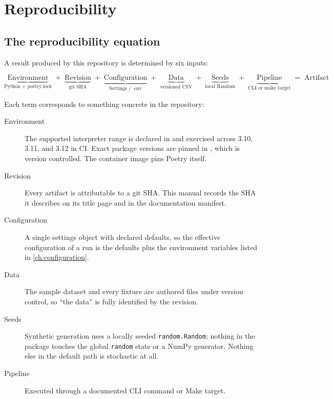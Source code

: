 
\chapter{Reproducibility}
\label{ch:reproducibility}

\section{The reproducibility equation}

A result produced by this repository is determined by six inputs:

\begin{equation}
\underbrace{\text{Environment}}_{\text{Python + poetry.lock}}
\;+\;
\underbrace{\text{Revision}}_{\text{git SHA}}
\;+\;
\underbrace{\text{Configuration}}_{\text{Settings / .env}}
\;+\;
\underbrace{\text{Data}}_{\text{versioned CSV}}
\;+\;
\underbrace{\text{Seeds}}_{\text{local Random}}
\;+\;
\underbrace{\text{Pipeline}}_{\text{CLI or make target}}
\;=\;
\text{Artifact}
\label{eq:reproducibility}
\end{equation}

Each term corresponds to something concrete in the repository:

\begin{description}
  \item[Environment] The supported interpreter range is declared in
     and exercised across 3.10, 3.11, and 3.12 in CI.
    Exact package versions are pinned in , which is
    version controlled. The container image pins Poetry itself.
  \item[Revision] Every artifact is attributable to a git SHA. This manual
    records the SHA it describes on its title page and in the documentation
    manifest.
  \item[Configuration] A single settings object with declared defaults, so the
    effective configuration of a run is the defaults plus the environment
    variables listed in \cref{ch:configuration}.
  \item[Data] The sample dataset and every fixture are authored files under
    version control, so ``the data'' is fully identified by the revision.
  \item[Seeds] Synthetic generation uses a locally seeded
    \texttt{random.Random}; nothing in the package touches the global
    \texttt{random} state or a NumPy generator. Nothing else in the default
    path is stochastic at all.
  \item[Pipeline] Executed through a documented CLI command or Make target.
\end{description}

